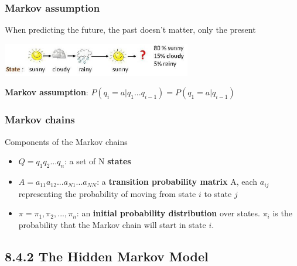\documentclass[13.5pt,aspecratio=169]{beamer}
\begin{document}


\begin{frame}
\onehalfspacing
	\frametitle{Markov assumption}
    {\large When predicting the future, the past doesn’t matter, only the present} \vspace{2em}

    \includegraphics[width=0.62\textwidth]{Rain_Prediction.png}

    \begin{center}
        \textbf{Markov assumption}: \hspace{1em} $P(q_i = a | q_1 ... q_{i-1}) = P(q_1 = a | q_{i-1})$
    \end{center}
\end{frame}

\begin{frame}
    \onehalfspacing
        \frametitle{Markov chains}
        
        \begin{block}{Components of the Markov chains}
            \begin{itemize}
                \item $Q = q_1 q_2 ... q_n$: a set of N \textbf{states}
                \item $A = a_{11} a_{12} ... a_{N1} ... a_{NN}$: a \textbf{transition probability matrix} A, each $a_{ij}$ representing the probability of moving from state $i$ to state $j$
                \item $\pi = \pi_1, \pi_2,...,\pi_n$:  an \textbf{initial probability distribution} over states. $\pi_i$ is the
                probability that the Markov chain will start in state $i$.
            \end{itemize}
        \end{block}
        
\end{frame}
\subsection{8.4.2 The Hidden Markov Model}
\end{document}
